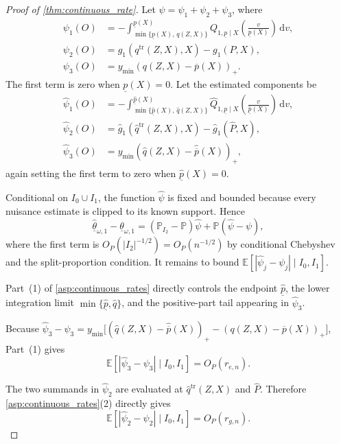 \begin{proof}[Proof of \cref{thm:continuous_rate}]

Let $\psi=\psi_1+\psi_2+\psi_3$, where
\begin{align*}
    \psi_1(O)&=-\int_{\min\{\underline{p}(X),\,q(Z,X)\}}^{\underline{p}(X)}Q_{1,\underline p\mid X}\!\left(\frac{v}{\underline{p}(X)}\right)\,\mathrm dv,\\
    \psi_2(O)&=g_1(q^{\mathrm{tr}}(Z,X),X)-g_1(P,X),\\
    \psi_3(O)&=y_{\min}(q(Z,X)-\overline{p}(X))_+.
\end{align*}
The first term is zero when $\underline{p}(X)=0$. Let the estimated components be
\begin{align*}
    \hat\psi_1(O)&=-\int_{\min\{\hat{\underline p}(X),\,\hat q(Z,X)\}}^{\hat{\underline p}(X)}\widehat Q_{1,\underline p\mid X}\!\left(\frac{v}{\hat{\underline p}(X)}\right)\,\mathrm dv,\\
    \hat\psi_2(O)&=\hat g_1(\hat q^{\mathrm{tr}}(Z,X),X)-\hat g_1(\hat P,X),\\
    \hat\psi_3(O)&=y_{\min}(\hat q(Z,X)-\hat{\overline p}(X))_+,
\end{align*}
again setting the first term to zero when $\hat{\underline p}(X)=0$.

\medskip
Conditional on $I_0\cup I_1$, the function $\hat\psi$ is fixed and bounded because every nuisance estimate is clipped to its known support. Hence
\[
    \hat{\underline\theta}_{\omega,1}-\underline\theta_{\omega,1}
    =(\mathbb P_{I_2}-\mathbb P)\hat\psi
      +\mathbb P(\hat\psi-\psi),
\]
where the first term is $O_P(|I_2|^{-1/2})=O_P(n^{-1/2})$ by conditional Chebyshev and the split-proportion condition. It remains to bound $\mathbb E[|\hat\psi_j-\psi_j|\mid I_0,I_1]$.

\medskip
Part~(1) of \cref{asp:continuous_rates} directly controls the endpoint $\hat{\underline p}$, the lower integration limit $\min\{\hat{\underline p},\hat q\}$, and the positive-part tail appearing in $\hat\psi_3$.

\medskip
Because $\hat\psi_3-\psi_3=y_{\min}\bigl[(\hat q(Z,X)-\hat{\overline p}(X))_+-(q(Z,X)-\overline{p}(X))_+\bigr]$, Part~(1) gives
\[
    \mathbb E[|\hat\psi_3-\psi_3|\mid I_0,I_1]=O_P(r_{e,n}).
\]

\medskip
The two summands in $\hat\psi_2$ are evaluated at $\hat q^{\mathrm{tr}}(Z,X)$ and $\hat P$. Therefore \cref{asp:continuous_rates}(2) directly gives
\[
    \mathbb E[|\hat\psi_2-\psi_2|\mid I_0,I_1]
    =O_P(r_{g,n}).
\]


\end{proof}

